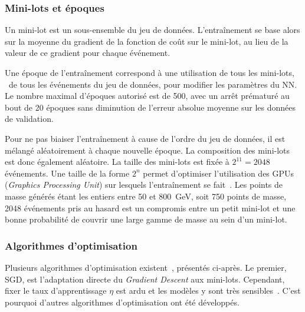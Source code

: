 \subsubsection{Mini-lots et époques}\label{chapter-ML-section-DNN-training-minibatch}
Un mini-lot est un sous-ensemble du jeu de données.
L'entraînement se base alors sur la moyenne du gradient de la fonction de coût sur le mini-lot, au lieu de la valeur de ce gradient pour chaque événement.
\par
Une \og époque \fg{} de l'entraînement correspond à une utilisation de tous les mini-lots, \ie\ de tous les événements du jeu de données, pour modifier les paramètres du NN.
Le nombre maximal d'époques autorisé est de \num{500}, avec un arrêt prématuré au bout de \num{20} époques sans diminution de l'erreur absolue moyenne sur les données de validation.
\par
Pour ne pas biaiser l'entraînement à cause de l'ordre du jeu de données,
il est mélangé aléatoirement à chaque nouvelle époque.
La composition des mini-lots est donc également aléatoire.
La taille des mini-lots est fixée à $2^{11}=\num{2048}$ événements.
Une taille de la forme $2^n$ permet d'optimiser l'utilisation des GPUs (\emph{Graphics Processing Unit}) sur lesquels l'entraînement se fait~\cite{DNN}.
Les points de masse générés étant les entiers entre \num{50} et \SI{800}{\GeV}, soit \num{750} points de masse,
\num{2048} événements pris au hasard est un compromis entre
un petit mini-lot
et
une bonne probabilité de couvrir une large gamme de masse au sein d'un mini-lot.
\subsubsection{Algorithmes d'optimisation}\label{chapter-ML-section-DNN-training-optimizers}
Plusieurs algorithmes d'optimisation existent~\cite{DNN}, présentés ci-après.
Le premier, SGD, est l'adaptation directe du \emph{Gradient Descent} aux mini-lots.
Cependant, fixer le taux d'apprentissage $\eta$ est ardu et les modèles y sont très sensibles~\cite{DNN}.
C'est pourquoi d'autres algorithmes d'optimisation ont été développés.
